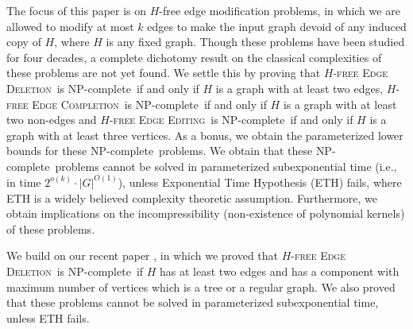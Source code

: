 \documentclass[envcountsame,envcountsect,10pt,oribibl]{llncs}
\newcommand{\pname}[1]{\textnormal{\textsc{#1}}}
\newcommand{\cclass}[1]{\textnormal{\textsf{#1}}}
\newcommand{\HED}{\pname{$H$-free Edge Deletion}}
\newcommand{\HEC}{\pname{$H$-free Edge Completion}}
\newcommand{\HEE}{\pname{$H$-free Edge Editing}}
\newcommand{\NPC}{\cclass{NP-complete}}
\begin{document}
The focus of this paper is on $H$-free edge modification problems,
in which we are allowed to modify at most $k$ edges to make the input
graph devoid of any induced copy of $H$, where $H$ is any fixed graph.
Though these problems have been studied for four decades, a complete
dichotomy result on the classical complexities of these problems are not yet found.
We settle this by proving that \HED\ is \NPC\ if and only if $H$ is a graph with at least two edges, 
\HEC\ is \NPC\ if and only if $H$ is a graph with at least two non-edges and
 \HEE\ is \NPC\ if and only if $H$ is a graph with at least three vertices.
As a bonus, we obtain the parameterized lower bounds for these \NPC\ problems.
We obtain that these \NPC\ problems cannot be solved in parameterized 
subexponential time (i.e., in time $2^{o(k)}\cdot |G|^{O(1)}$), unless
Exponential Time Hypothesis (ETH) fails, where ETH is a widely believed complexity theoretic
assumption. Furthermore, we obtain implications on the incompressibility 
(non-existence of polynomial kernels) of these problems.

We build on our recent paper \cite{DBLP:conf/cocoa/AravindSS15},
in which we proved that \HED\ is \NPC\ if $H$ has at least two edges and 
has a component with
maximum number of vertices which is a tree or a regular graph.
We also proved that these problems cannot be solved in parameterized 
subexponential time, unless ETH fails.
\end{document}
